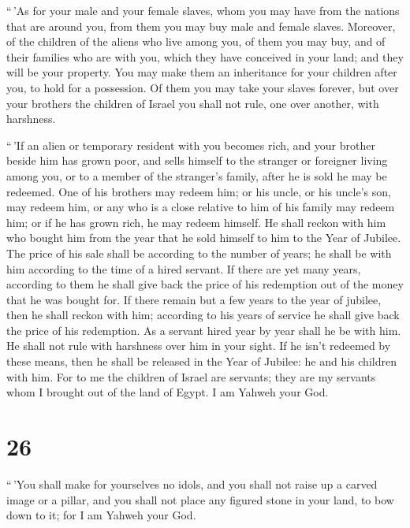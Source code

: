  ``\,'As for your male and your female slaves, whom you
may have from the nations that are around you, from them you may buy
male and female slaves.  Moreover, of the children of the
aliens who live among you, of them you may buy, and of their families
who are with you, which they have conceived in your land; and they will
be your property.  You may make them an inheritance for
your children after you, to hold for a possession. Of them you may take
your slaves forever, but over your brothers the children of Israel you
shall not rule, one over another, with harshness.

 ``\,'If an alien or temporary resident with you becomes
rich, and your brother beside him has grown poor, and sells himself to
the stranger or foreigner living among you, or to a member of the
stranger's family,  after he is sold he may be redeemed.
One of his brothers may redeem him;  or his uncle, or his
uncle's son, may redeem him, or any who is a close relative to him of
his family may redeem him; or if he has grown rich, he may redeem
himself.  He shall reckon with him who bought him from
the year that he sold himself to him to the Year of Jubilee. The price
of his sale shall be according to the number of years; he shall be with
him according to the time of a hired servant.  If there
are yet many years, according to them he shall give back the price of
his redemption out of the money that he was bought for. 
If there remain but a few years to the year of jubilee, then he shall
reckon with him; according to his years of service he shall give back
the price of his redemption.  As a servant hired year by
year shall he be with him. He shall not rule with harshness over him in
your sight.  If he isn't redeemed by these means, then he
shall be released in the Year of Jubilee: he and his children with him.
 For to me the children of Israel are servants; they are
my servants whom I brought out of the land of Egypt. I am Yahweh your
God.

\hypertarget{section-25}{%
\section{26}\label{section-25}}

 ``\,'You shall make for yourselves no idols, and you
shall not raise up a carved image or a pillar, and you shall not place
any figured stone in your land, to bow down to it; for I am Yahweh your
God.

